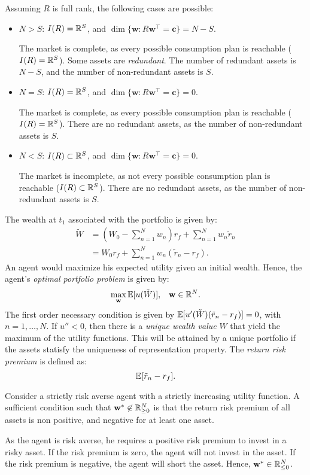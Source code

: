 \documentclass[twoside]{article}
\begin{document}
Assuming $R$ is full rank, the following cases are possible:
\begin{itemize}
    \item $N > S$: $I(R) = \mathbb{R}^S$, and $\dim\{\mathbf{w} : R\mathbf{w}^\top = \mathbf{c}\} = N-S$.
    \begin{explanation}
        The market is complete, as every possible consumption plan is reachable ($I(R) = \mathbb{R}^S$). Some assets are \textit{redundant}. The number of redundant assets is $N-S$, and the number of non-redundant assets is $S$.
    \end{explanation}
    \item $N = S$: $I(R) = \mathbb{R}^S$, and $\dim\{\mathbf{w} : R\mathbf{w}^\top = \mathbf{c}\} = 0$.
    \begin{explanation}
        The market is complete, as every possible consumption plan is reachable ($I(R) = \mathbb{R}^S$). There are no redundant assets, as the number of non-redundant assets is $S$.
    \end{explanation}
    \item $N < S$: $I(R) \subset \mathbb{R}^S$, and $\dim\{\mathbf{w} : R\mathbf{w}^\top = \mathbf{c}\} = 0$.
    \begin{explanation}
        The market is incomplete, as not every possible consumption plan is reachable ($I(R) \subset \mathbb{R}^S$). There are no redundant assets, as the number of non-redundant assets is $S$.
    \end{explanation}
\end{itemize}
The wealth at $t_1$ associated with the portfolio is given by:
\begin{align*}
    \tilde{W} &= \left(W_0 - \sum_{n=1}^N w_n\right)r_f + \sum_{n=1}^N w_n \tilde{r}_n \\
    &= W_0r_f + \sum_{n=1}^N w_n(\tilde{r}_n - r_f).
\end{align*} 
An agent would maximize his expected utility given an initial wealth. Hence, the agent's \textit{optimal portfolio problem} is given by:
\[
    \max_{\mathbf{w}} \mathbb{E}[u(\tilde{W})], \;\;\; \mathbf{w} \in \mathbb{R}^N.
\]
The first order necessary condition is given by $\mathbb{E}[u'(\tilde{W})(\tilde{r}_n - r_f)] = 0$, with $n = 1, \dots, N$. If $u'' < 0$, then there is a \textit{unique wealth value} $W$ that yield the maximum of the utility functions. This will be attained by a unique portfolio if the assets statisfy the uniqueness of representation property. The \textit{return risk premium} is defined as:
\[
    \mathbb{E}[\tilde{r}_n - r_f].
\]

\begin{proposition}
    Consider a strictly risk averse agent with a strictly increasing utility function. A sufficient condition such that $\mathbf{w}^* \not\in \mathbb{R}^N_{\geq 0}$ is that the return risk premium of all assets is non positive, and negative for at least one asset.
    \begin{explanation}
        As the agent is risk averse, he requires a positive risk premium to invest in a risky asset. If the risk premium is zero, the agent will not invest in the asset. If the risk premium is negative, the agent will short the asset. Hence, $\mathbf{w}^* \in \mathbb{R}^N_{\leq 0}$.
    \end{explanation}
\end{proposition}
\end{document}
